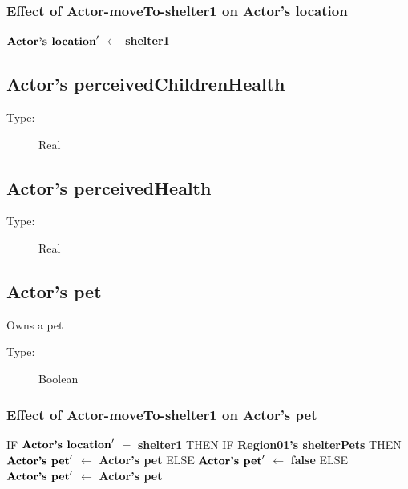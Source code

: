 \documentclass{article}%
\begin{document}
%
\subsubsection{Effect of Actor{-}moveTo{-}shelter1 on Actor's location}%
\label{ssubsec:Effect of Actor{-}moveTo{-}shelter1 on Actor's location}%
\begin{flushleft}%
$\mbox{\textbf{Actor's location}} '$%
$\leftarrow$%
\textbf{shelter1}%
\end{flushleft}

%
\subsection{Actor's perceivedChildrenHealth}%
\label{subsec:Actor's perceivedChildrenHealth}%
\begin{description}%
\item[Type:]%
Real%
\end{description}

%
\subsection{Actor's perceivedHealth}%
\label{subsec:Actor's perceivedHealth}%
\begin{description}%
\item[Type:]%
Real%
\end{description}

%
\subsection{Actor's pet}%
\label{subsec:Actor's pet}%
Owns a pet%
\begin{description}%
\item[Type:]%
Boolean%
\end{description}%
\subsubsection{Effect of Actor{-}moveTo{-}shelter1 on Actor's pet}%
\label{ssubsec:Effect of Actor{-}moveTo{-}shelter1 on Actor's pet}%
\begin{flushleft}%
IF %
$\mbox{\textbf{Actor's location}} '$%
$=$%
\textbf{shelter1}%
\linebreak%
\hspace*{2em}%
THEN %
IF %
\textbf{Region01's shelterPets}%
\linebreak%
\hspace*{4em}%
THEN %
$\mbox{\textbf{Actor's pet}} '$%
$\leftarrow$%
\textbf{Actor's pet}%
\linebreak%
\hspace*{4em}%
ELSE %
$\mbox{\textbf{Actor's pet}} '$%
$\leftarrow$%
\textbf{false}%
\linebreak%
\hspace*{2em}%
ELSE %
$\mbox{\textbf{Actor's pet}} '$%
$\leftarrow$%
\textbf{Actor's pet}%
\end{flushleft}
\end{document}
